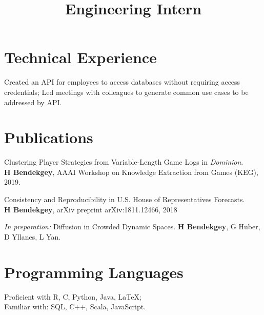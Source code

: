 \documentclass[margin]{res}
\begin{document}
\begin{resume}
\begin{position}
\end{position}

\section{Technical Experience}

\location{}
\title{\textbf{Engineering Intern}}
\begin{position}
Created an API for employees to access databases without requiring access credentials;
Led meetings with colleagues to generate common use cases to be addressed by API.\end{position}


\section{Publications}
\par
Clustering Player Strategies from Variable-Length Game Logs in \emph{Dominion}.\\ \textbf{H Bendekgey}, AAAI Workshop on Knowledge Extraction from Games (KEG), 2019.

Consistency and Reproducibility in U.S. House of Representatives Forecasts.\\ \textbf{H Bendekgey}, arXiv preprint arXiv:1811.12466, 2018

\emph{In preparation:} Diffusion in Crowded Dynamic Spaces. \textbf{H Bendekgey}, G Huber, D Yllanes, L Yan.


\section{Programming Languages}

Proficient with R, C, Python, Java, \LaTeX;\\ Familiar with:  SQL, C++, Scala, JavaScript.


\end{resume}
\end{document}
